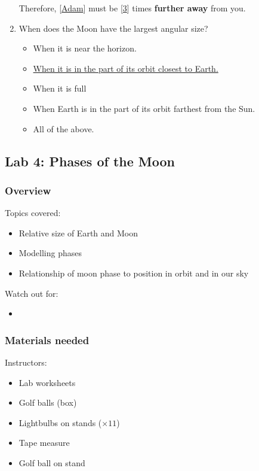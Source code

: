 \documentclass[12pt]{article}
\begin{document}
\begin{enumerate}
Therefore, [\underline{Adam}] must be [\underline{3}] times \textbf{further away} from you.
\item
When does the Moon have the largest angular size?
\begin{itemize}
    \item When it is near the horizon.
    \item \underline{When it is in the part of its orbit closest to Earth.}
    \item When it is full
    \item When Earth is in the part of its orbit farthest from the Sun.
    \item All of the above.
\end{itemize}
\end{enumerate}


\newpage
\subsection{Lab 4: Phases of the Moon}

\subsubsection{Overview}

Topics covered:
\begin{itemize}
\item Relative size of Earth and Moon
\item Modelling phases
\item Relationship of moon phase to position in orbit and in our sky
\end{itemize}

\noindent
Watch out for:
\begin{itemize}
\item 
\end{itemize}


\subsubsection{Materials needed}

Instructors:
\begin{itemize}
\item Lab worksheets
\item Golf balls (box)
\item Lightbulbs on stands ($\times 11$)
\item Tape measure
\item Golf ball on stand
\end{itemize}
\end{document}
